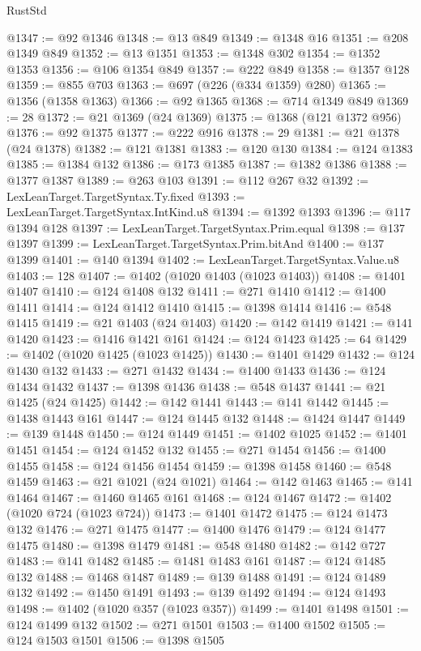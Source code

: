 \begin{lexlean}{RustStd}
\begin{coremodule}
{\begin{coremodule}
{{{{{{{{{{{{{{{{{{{{{{{{{{{{{{{{{{{{{@1347 := @92 @1346
@1348 := @13 @849
@1349 := @1348 @16
@1351 := @208 @1349 @849
@1352 := @13 @1351
@1353 := @1348 @302
@1354 := @1352 @1353
@1356 := @106 @1354 @849
@1357 := @222 @849
@1358 := @1357 @128
@1359 := @855 @703
@1363 := @697 (@226 (@334 @1359) @280)
@1365 := @1356 (@1358 @1363)
@1366 := @92 @1365
@1368 := @714 @1349 @849
@1369 := 28
@1372 := @21 @1369 (@24 @1369)
@1375 := @1368 (@121 @1372 @956)
@1376 := @92 @1375
@1377 := @222 @916
@1378 := 29
@1381 := @21 @1378 (@24 @1378)
@1382 := @121 @1381
@1383 := @120 @130
@1384 := @124 @1383
@1385 := @1384 @132
@1386 := @173 @1385
@1387 := @1382 @1386
@1388 := @1377 @1387
@1389 := @263 @103
@1391 := @112 @267 @32
@1392 := LexLeanTarget.TargetSyntax.Ty.fixed
@1393 := LexLeanTarget.TargetSyntax.IntKind.u8
@1394 := @1392 @1393
@1396 := @117 @1394 @128
@1397 := LexLeanTarget.TargetSyntax.Prim.equal
@1398 := @137 @1397
@1399 := LexLeanTarget.TargetSyntax.Prim.bitAnd
@1400 := @137 @1399
@1401 := @140 @1394
@1402 := LexLeanTarget.TargetSyntax.Value.u8
@1403 := 128
@1407 := @1402 (@1020 @1403 (@1023 @1403))
@1408 := @1401 @1407
@1410 := @124 @1408 @132
@1411 := @271 @1410
@1412 := @1400 @1411
@1414 := @124 @1412 @1410
@1415 := @1398 @1414
@1416 := @548 @1415
@1419 := @21 @1403 (@24 @1403)
@1420 := @142 @1419
@1421 := @141 @1420
@1423 := @1416 @1421 @161
@1424 := @124 @1423
@1425 := 64
@1429 := @1402 (@1020 @1425 (@1023 @1425))
@1430 := @1401 @1429
@1432 := @124 @1430 @132
@1433 := @271 @1432
@1434 := @1400 @1433
@1436 := @124 @1434 @1432
@1437 := @1398 @1436
@1438 := @548 @1437
@1441 := @21 @1425 (@24 @1425)
@1442 := @142 @1441
@1443 := @141 @1442
@1445 := @1438 @1443 @161
@1447 := @124 @1445 @132
@1448 := @1424 @1447
@1449 := @139 @1448
@1450 := @124 @1449
@1451 := @1402 @1025
@1452 := @1401 @1451
@1454 := @124 @1452 @132
@1455 := @271 @1454
@1456 := @1400 @1455
@1458 := @124 @1456 @1454
@1459 := @1398 @1458
@1460 := @548 @1459
@1463 := @21 @1021 (@24 @1021)
@1464 := @142 @1463
@1465 := @141 @1464
@1467 := @1460 @1465 @161
@1468 := @124 @1467
@1472 := @1402 (@1020 @724 (@1023 @724))
@1473 := @1401 @1472
@1475 := @124 @1473 @132
@1476 := @271 @1475
@1477 := @1400 @1476
@1479 := @124 @1477 @1475
@1480 := @1398 @1479
@1481 := @548 @1480
@1482 := @142 @727
@1483 := @141 @1482
@1485 := @1481 @1483 @161
@1487 := @124 @1485 @132
@1488 := @1468 @1487
@1489 := @139 @1488
@1491 := @124 @1489 @132
@1492 := @1450 @1491
@1493 := @139 @1492
@1494 := @124 @1493
@1498 := @1402 (@1020 @357 (@1023 @357))
@1499 := @1401 @1498
@1501 := @124 @1499 @132
@1502 := @271 @1501
@1503 := @1400 @1502
@1505 := @124 @1503 @1501
@1506 := @1398 @1505
}}}}}}}}}}}}}}}}}}}}}}}}}}}}}}}}}}}}}
\end{coremodule}}
\end{coremodule}
\end{lexlean}
